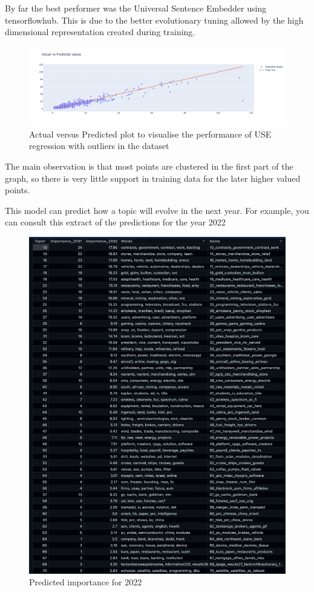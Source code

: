 \documentclass[12pt,MSc,a4paper,oneside]{muthesis}
\begin{document}
By far the best performer was the Universal Sentence Embedder using tensorflowhub. This is due to the better evolutionary tuning allowed by the high dimensional representation created during training. \\
\begin{figure}[h]
    \centering
    \includegraphics[scale=0.25]{results/Regression result.png}
    \caption{Actual versus Predicted plot to visualise the performance of USE regression with outliers in the dataset}
\end{figure}

The main observation is that most points are clustered in the first part of the graph, so there is very little support in training data for the later higher valued points.

This model can predict how a topic will evolve in the next year. For example, you can consult this extract of the predictions for the year 2022
\begin{figure}[h]
    \centering
    \includegraphics[scale=0.6]{results/result_regression_2022.png}
    \caption{Predicted importance for 2022}
\end{figure}
\end{document}
